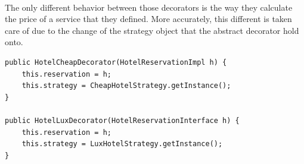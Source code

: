 \paragraph{}
The only different behavior between those decorators is the way they calculate the price of a service that they defined. More accurately, this different is taken care of due to the change of the strategy object that the abstract decorator hold onto. 

\begin{lstlisting}
public HotelCheapDecorator(HotelReservationImpl h) {
	this.reservation = h;
	this.strategy = CheapHotelStrategy.getInstance();
}

public HotelLuxDecorator(HotelReservationInterface h) {
	this.reservation = h;
	this.strategy = LuxHotelStrategy.getInstance();
}
\end{lstlisting}



